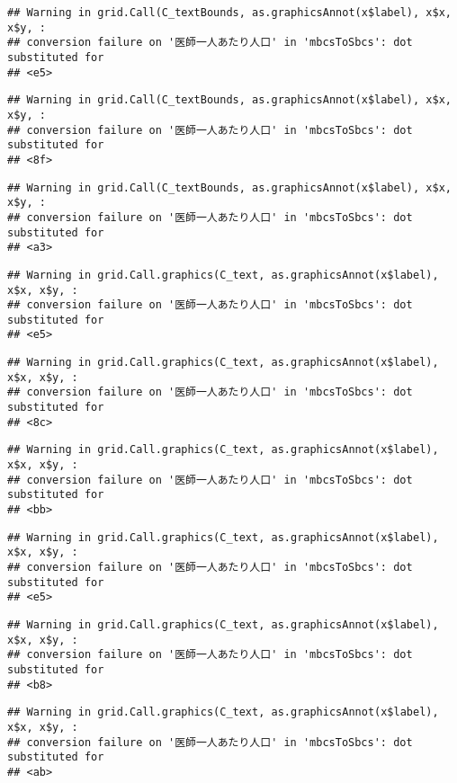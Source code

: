 \documentclass[
]{article}
\begin{document}
\begin{verbatim}
## Warning in grid.Call(C_textBounds, as.graphicsAnnot(x$label), x$x, x$y, :
## conversion failure on '医師一人あたり人口' in 'mbcsToSbcs': dot substituted for
## <e5>
\end{verbatim}

\begin{verbatim}
## Warning in grid.Call(C_textBounds, as.graphicsAnnot(x$label), x$x, x$y, :
## conversion failure on '医師一人あたり人口' in 'mbcsToSbcs': dot substituted for
## <8f>
\end{verbatim}

\begin{verbatim}
## Warning in grid.Call(C_textBounds, as.graphicsAnnot(x$label), x$x, x$y, :
## conversion failure on '医師一人あたり人口' in 'mbcsToSbcs': dot substituted for
## <a3>
\end{verbatim}

\begin{verbatim}
## Warning in grid.Call.graphics(C_text, as.graphicsAnnot(x$label), x$x, x$y, :
## conversion failure on '医師一人あたり人口' in 'mbcsToSbcs': dot substituted for
## <e5>
\end{verbatim}

\begin{verbatim}
## Warning in grid.Call.graphics(C_text, as.graphicsAnnot(x$label), x$x, x$y, :
## conversion failure on '医師一人あたり人口' in 'mbcsToSbcs': dot substituted for
## <8c>
\end{verbatim}

\begin{verbatim}
## Warning in grid.Call.graphics(C_text, as.graphicsAnnot(x$label), x$x, x$y, :
## conversion failure on '医師一人あたり人口' in 'mbcsToSbcs': dot substituted for
## <bb>
\end{verbatim}

\begin{verbatim}
## Warning in grid.Call.graphics(C_text, as.graphicsAnnot(x$label), x$x, x$y, :
## conversion failure on '医師一人あたり人口' in 'mbcsToSbcs': dot substituted for
## <e5>
\end{verbatim}

\begin{verbatim}
## Warning in grid.Call.graphics(C_text, as.graphicsAnnot(x$label), x$x, x$y, :
## conversion failure on '医師一人あたり人口' in 'mbcsToSbcs': dot substituted for
## <b8>
\end{verbatim}

\begin{verbatim}
## Warning in grid.Call.graphics(C_text, as.graphicsAnnot(x$label), x$x, x$y, :
## conversion failure on '医師一人あたり人口' in 'mbcsToSbcs': dot substituted for
## <ab>
\end{verbatim}
\end{document}
